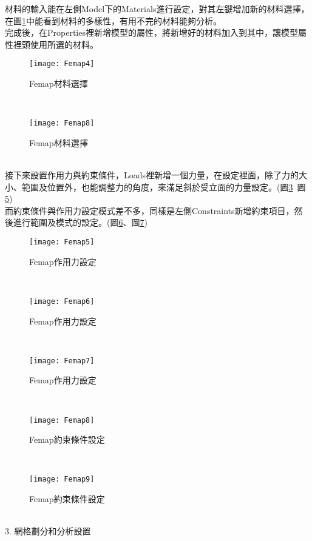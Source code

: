 \begin{itemize}
\qquad 材料的輸入能在左側Model下的Materials進行設定，對其左鍵增加新的材料選擇，在圖\ref{3.04}中能看到材料的多樣性，有用不完的材料能夠分析。\\

\qquad 完成後，在Properties裡新增模型的屬性，將新增好的材料加入到其中，讓模型屬性裡頭使用所選的材料。\\
\begin{figure}[hbt!]
\begin{center}
\texttt{[image: Femap4]}
\caption{\Large Femap材料選擇}\label{3.04}
\end{center}
\end{figure}
\\
\begin{figure}[hbt!]
\begin{center}
\texttt{[image: Femap8]}
\caption{\Large Femap材料選擇}\label{3.05}
\end{center}
\end{figure}
\\

\qquad 接下來設置作用力與約束條件，Loads裡新增一個力量，在設定裡面，除了力的大小、範圍及位置外，也能調整力的角度，來滿足斜於受立面的力量設定。(圖\ref{3.05}~圖\ref{3.07})\\

\qquad 而約束條件與作用力設定模式差不多，同樣是左側Constraints新增約束項目，然後進行範圍及模式的設定。(圖\ref{3.08}、圖\ref{3.09})\\
\begin{figure}[hbt!]
\begin{center}
\texttt{[image: Femap5]}
\caption{\Large Femap作用力設定}\label{3.05}
\end{center}
\end{figure}
\\
\begin{figure}[hbt!]
\begin{center}
\texttt{[image: Femap6]}
\caption{\Large Femap作用力設定}\label{3.06}
\end{center}
\end{figure}
\\
\begin{figure}[hbt!]
\begin{center}
\texttt{[image: Femap7]}
\caption{\Large Femap作用力設定}\label{3.07}
\end{center}
\end{figure}
\\
\begin{figure}[hbt!]
\begin{center}
\texttt{[image: Femap8]}
\caption{\Large Femap約束條件設定}\label{3.08}
\end{center}
\end{figure}
\\
\begin{figure}[hbt!]
\begin{center}
\texttt{[image: Femap9]}
\caption{\Large Femap約束條件設定}\label{3.09}
\end{center}
\end{figure}
\\
3. 網格劃分和分析設置\\


\end{itemize}
